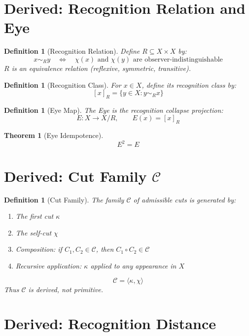 \documentclass[12pt]{article}
\newtheorem{definition}[axiom]{Definition}
\newtheorem{theorem}[axiom]{Theorem}
\begin{document}
\section{Derived: Recognition Relation and Eye}

\begin{definition}[Recognition Relation]
Define \(R \subseteq X \times X\) by:
\[
x \sim_R y \quad\Longleftrightarrow\quad \chi(x) \text{ and } \chi(y) \text{ are observer-indistinguishable}
\]
\(R\) is an equivalence relation (reflexive, symmetric, transitive).
\end{definition}

\begin{definition}[Recognition Class]
For \(x \in X\), define its recognition class by:
\[
[x]_R = \{ y \in X : y \sim_R x \}
\]
\end{definition}

\begin{definition}[Eye Map]
The Eye is the recognition collapse projection:
\[
E: X \to X/R, \qquad E(x) = [x]_R
\]
\end{definition}

\begin{theorem}[Eye Idempotence]
\[
E^2 = E
\]
\end{theorem}

\section{Derived: Cut Family \(\mathcal{C}\)}

\begin{definition}[Cut Family]
The family \(\mathcal{C}\) of admissible cuts is generated by:
\begin{enumerate}
    \item The first cut \(\kappa\)
    \item The self-cut \(\chi\)
    \item Composition: if \(C_1, C_2 \in \mathcal{C}\), then \(C_1 \circ C_2 \in \mathcal{C}\)
    \item Recursive application: \(\kappa\) applied to any appearance in \(X\)
\end{enumerate}
\[
\mathcal{C} = \langle \kappa, \chi \rangle
\]
Thus \(\mathcal{C}\) is derived, not primitive.
\end{definition}

\section{Derived: Recognition Distance}
\end{document}
